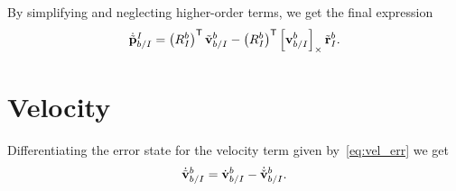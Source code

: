 By simplifying and neglecting higher-order terms, we get the final expression
\begin{equation}
  \dot{\tilde{\boldsymbol{\mathrm{p}}}}_{b/I}^{I} = \left(R_{I}^{b}\right)^{\mathsf{T}}
  \tilde{\boldsymbol{\mathrm{v}}}_{b/I}^{b} - \left(R_{I}^{b}\right)^{\mathsf{T}}
    \left[ \boldsymbol{\mathrm{v}}_{b/I}^{b} \right]_{\times} \tilde{\boldsymbol{\mathrm{r}}}_I^b.
\end{equation}

\section{Velocity}

Differentiating the error state for the velocity term given
by~\eqref{eq:vel_err} we get
\begin{equation}
  \dot{\tilde{\boldsymbol{\mathrm{v}}}}_{b/I}^{b} = \dot{\boldsymbol{\mathrm{v}}}_{b/I}^{b} -
    \dot{\check{\boldsymbol{\mathrm{v}}}}_{b/I}^{b}.
\end{equation}


